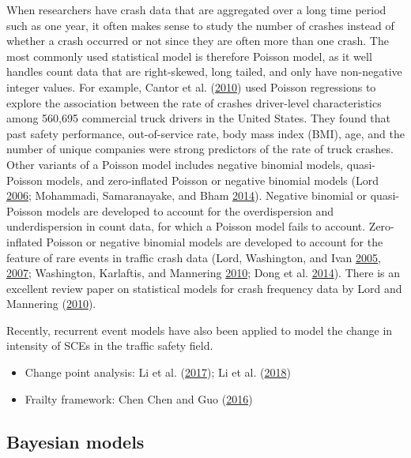 \documentclass[12pt]{book}
\numberwithin{equation}{chapter}
\providecommand{\tightlist}{%
  \setlength{\itemsep}{0pt}\setlength{\parskip}{0pt}}
\begin{document}
When researchers have crash data that are aggregated over a long time period such as one year, it often makes sense to study the number of crashes instead of whether a crash occurred or not since they are often more than one crash. The most commonly used statistical model is therefore Poisson model, as it well handles count data that are right-skewed, long tailed, and only have non-negative integer values. For example, Cantor et al. (\protect\hyperlink{ref-cantor2010driver}{2010}) used Poisson regressions to explore the association between the rate of crashes driver-level characteristics among 560,695 commercial truck drivers in the United States. They found that past safety performance, out-of-service rate, body mass index (BMI), age, and the number of unique companies were strong predictors of the rate of truck crashes.
Other variants of a Poisson model includes negative binomial models, quasi-Poisson models, and zero-inflated Poisson or negative binomial models (Lord \protect\hyperlink{ref-lord2006modeling}{2006}; Mohammadi, Samaranayake, and Bham \protect\hyperlink{ref-mohammadi2014crash}{2014}). Negative binomial or quasi-Poisson models are developed to account for the overdispersion and underdispersion in count data, for which a Poisson model fails to account. Zero-inflated Poisson or negative binomial models are developed to account for the feature of rare events in traffic crash data (Lord, Washington, and Ivan \protect\hyperlink{ref-lord2005poisson}{2005}, \protect\hyperlink{ref-lord2007further}{2007}; Washington, Karlaftis, and Mannering \protect\hyperlink{ref-washington2010statistical}{2010}; Dong et al. \protect\hyperlink{ref-dong2014multivariate}{2014}). There is an excellent review paper on statistical models for crash frequency data by Lord and Mannering (\protect\hyperlink{ref-lord2010statistical}{2010}).

Recently, recurrent event models have also been applied to model the change in intensity of SCEs in the traffic safety field.

\begin{itemize}
\tightlist
\item
  Change point analysis: Li et al. (\protect\hyperlink{ref-li2017evaluation}{2017}); Li et al. (\protect\hyperlink{ref-li2018bayesian}{2018})
\item
  Frailty framework: Chen Chen and Guo (\protect\hyperlink{ref-chen2016evaluating}{2016})
\end{itemize}

\hypertarget{bayesian-models}{%
\subsection{Bayesian models}\label{bayesian-models}}
\end{document}
